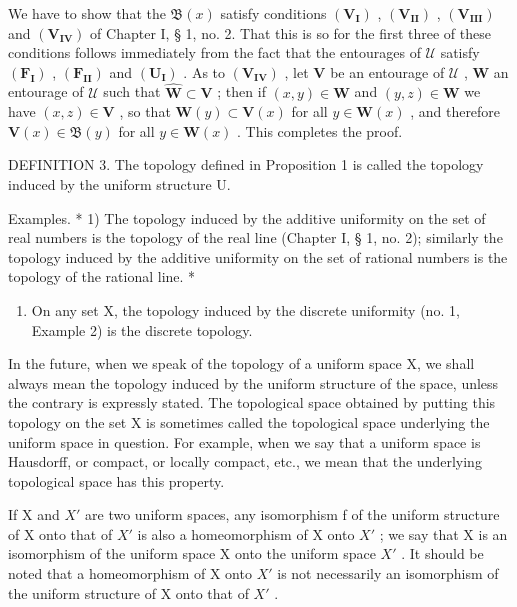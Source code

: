 We have to show that the \(\mathfrak{B}(x)\) satisfy conditions \((\mathbf{V}_{\mathbf{I}})\) , \((\mathbf{V}_{\mathbf{II}})\) , \((\mathbf{V}_{\mathbf{III}})\) and \((\mathbf{V}_{\mathbf{IV}})\) of Chapter I, § 1, no. 2. That this is so for the first three of these conditions follows immediately from the fact that the entourages of \(\mathcal{U}\) satisfy \((\mathbf{F}_{\mathbf{I}})\) , \((\mathbf{F}_{\mathbf{II}})\) and \((\mathbf{U}_{\mathbf{I}})\) . As to \((\mathbf{V}_{\mathbf{IV}})\) , let \(\mathbf{V}\) be an entourage of \(\mathcal{U}\) , \(\mathbf{W}\) an entourage of \(\mathcal{U}\) such that \(\hat{\mathbf{W}} \subset \mathbf{V}\) ; then if \((x, y) \in \mathbf{W}\) and \((y, z) \in \mathbf{W}\) we have \((x, z) \in \mathbf{V}\) , so that \(\mathbf{W}(y) \subset \mathbf{V}(x)\) for all \(y \in \mathbf{W}(x)\) , and therefore \(\mathbf{V}(x) \in \mathfrak{B}(y)\) for all \(y \in \mathbf{W}(x)\) . This completes the proof.

DEFINITION 3. The topology defined in Proposition 1 is called the topology induced by the uniform structure U.

Examples. * 1) The topology induced by the additive uniformity on the set of real numbers is the topology of the real line (Chapter I, § 1, no. 2); similarly the topology induced by the additive uniformity on the set of rational numbers is the topology of the rational line. *

\begin{enumerate}
\def\labelenumi{\arabic{enumi})}
\setcounter{enumi}{1}
\tightlist
\item
  On any set X, the topology induced by the discrete uniformity (no. 1, Example 2) is the discrete topology.
\end{enumerate}

In the future, when we speak of the topology of a uniform space X, we shall always mean the topology induced by the uniform structure of the space, unless the contrary is expressly stated. The topological space obtained by putting this topology on the set X is sometimes called the topological space underlying the uniform space in question. For example, when we say that a uniform space is Hausdorff, or compact, or locally compact, etc., we mean that the underlying topological space has this property.

If X and \(X'\) are two uniform spaces, any isomorphism f of the uniform structure of X onto that of \(X'\) is also a homeomorphism of X onto \(X'\) ; we say that X is an isomorphism of the uniform space X onto the uniform space \(X'\) . It should be noted that a homeomorphism of X onto \(X'\) is not necessarily an isomorphism of the uniform structure of X onto that of \(X'\) .

